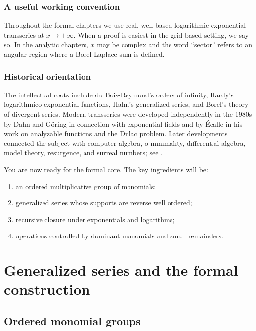 \documentclass[11pt,openany]{book}
\theoremstyle{plain}
\theoremstyle{definition}
\theoremstyle{remark}
\begin{document}
\section{A useful working convention}
Throughout the formal chapters we use real, well-based logarithmic-exponential transseries at $x\to+\infty$. When a proof is easiest in the grid-based setting, we say so. In the analytic chapters, $x$ may be complex and the word ``sector'' refers to an angular region where a Borel-Laplace sum is defined.

\section{Historical orientation}
The intellectual roots include du Bois-Reymond's orders of infinity, Hardy's logarithmico-exponential functions, Hahn's generalized series, and Borel's theory of divergent series. Modern transseries were developed independently in the 1980s by Dahn and G\"oring in connection with exponential fields and by \'{E}calle in his work on analyzable functions and the Dulac problem. Later developments connected the subject with computer algebra, o-minimality, differential algebra, model theory, resurgence, and surreal numbers; see \cite{DahnGoring1987,Ecalle1992,DMM2001,Hoeven2006,ADH2017}.

\begin{checkpointbox}
You are now ready for the formal core. The key ingredients will be:
\begin{enumerate}
\item an ordered multiplicative group of monomials;
\item generalized series whose supports are reverse well ordered;
\item recursive closure under exponentials and logarithms;
\item operations controlled by dominant monomials and small remainders.
\end{enumerate}
\end{checkpointbox}

\part{Generalized series and the formal construction}

\chapter{Ordered monomial groups}
\label{chap:monomials}
\end{document}
